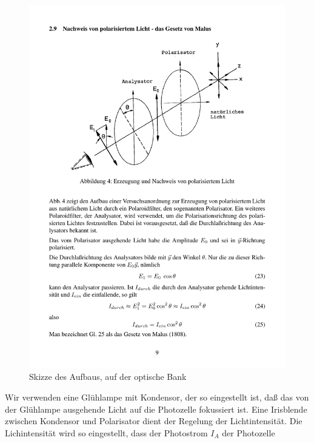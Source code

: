\documentclass[12pt]{scrartcl}
\begin{document}
\begin{figure}[H] 
  \centering
    \includegraphics[trim = 0mm 110mm 0mm 20mm, clip, scale = 1]{abb_4.pdf}
  	\caption[Skizze des Aufbaus, auf der optische Bank]{Skizze des Aufbaus, auf der optische Bank\footnotemark}
  \label{fig:abb_4}
\end{figure}

Wir verwenden eine Glühlampe mit Kondensor, der so eingestellt ist, daß das von der Glühlampe ausgehende Licht auf die Photozelle fokussiert ist. Eine Irisblende zwischen Kondensor und Polarisator dient der Regelung der Lichtintensität. Die
Lichintensität wird so eingestellt, dass der Photostrom $I_A$ der Photozelle 
\end{document}
